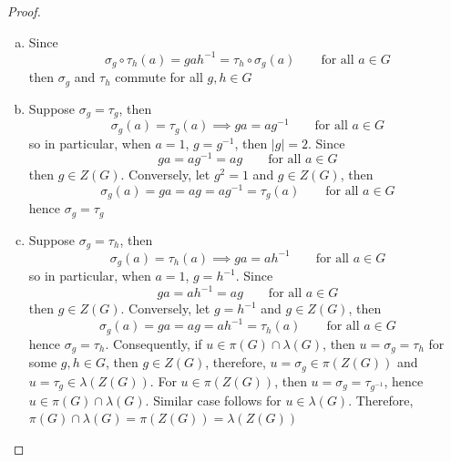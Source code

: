 \documentclass{article}
\begin{document}
\begin{proof}
    \begin{enumerate}[(a)]
        \item Since
        \[
        \sigma_g\circ \tau_h(a)=gah^{-1} = \tau_h\circ\sigma_g (a)\qquad \text{for all }a \in G
        \]
        then \( \sigma_g \) and \( \tau_h \) commute for all \( g, h \in G \)
        \item Suppose $\sigma_g=\tau_g$, then
        \[
            \sigma_g(a)=\tau_g(a)\implies ga=ag^{-1}\qquad \text{for all }a \in G
        \]
        so in particular, when $a=1$, $g=g^{-1}$, then $|g|=2$. Since 
        \[
            ga=ag^{-1}=ag\qquad \text{for all }a \in G
        \]
        then $g \in Z(G)$. Conversely, let $g^2=1$ and $g \in Z(G)$, then 
        \[
        \sigma_g(a)=ga=ag=ag^{-1}=\tau_g(a)\qquad \text{for all }a \in G
        \]
        hence $\sigma_g=\tau_g$
        \item Suppose $\sigma_g=\tau_h$, then
        \[
            \sigma_g(a)=\tau_h(a)\implies ga=ah^{-1}\qquad \text{for all }a \in G
        \]
        so in particular, when $a=1$, $g=h^{-1}$. Since 
        \[
            ga=ah^{-1}=ag\qquad \text{for all }a \in G
        \]
        then $g \in Z(G)$. Conversely, let $g=h^{-1}$ and $g \in Z(G)$, then 
        \[
        \sigma_g(a)=ga=ag=ah^{-1}=\tau_h(a)\qquad \text{for all }a \in G
        \]
        hence $\sigma_g=\tau_h$. Consequently, if $u \in \pi(G)\cap \lambda(G)$, then $u =\sigma_g=\tau_h$ for some $g, h \in G$, then $g \in Z(G)$, therefore, $u =\sigma_g\in \pi(Z(G))$ and $u =\tau_g\in \lambda(Z(G))$. For $u \in \pi(Z(G))$, then $u=\sigma_g=\tau_{g^{-1}}$, hence $u \in \pi(G)\cap \lambda(G)$. Similar case follows for $u \in \lambda(G)$. Therefore, \( \pi(G) \cap \lambda(G) = \pi(Z(G)) = \lambda(Z(G)) \)
    \end{enumerate}
\end{proof}
\end{document}

